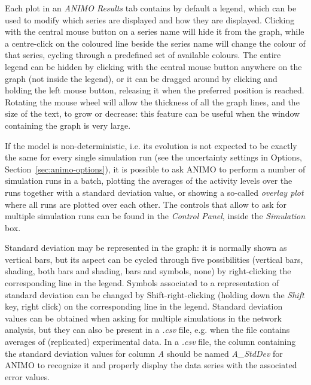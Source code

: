 \documentclass{article}
\begin{document}

Each plot in an \emph{ANIMO Results} tab contains by default a legend, which can be used to modify which series are
displayed and how they are displayed. Clicking with the central mouse button on a series name will hide it from the
graph, while a centre-click on the coloured line beside the series name will change the colour of that series,
cycling through a predefined set of available colours. The entire legend can be hidden by clicking with the
central mouse button anywhere on the graph (not inside the legend), or it can be dragged around by clicking and holding the left
mouse button, releasing it when the preferred position is reached. Rotating the mouse wheel will allow the thickness of all
the graph lines, and the size of the text, to grow or decrease: this feature can be useful when the window containing
the graph is very large.

If the model is non-deterministic, i.e. its
evolution is not expected to be exactly the same for every single simulation run (see the uncertainty settings in Options, Section~\ref{sec:animo-options}),
it is possible to ask ANIMO to perform
a number of simulation runs in a batch, plotting the averages of the activity levels over the runs together with a standard
deviation value, or showing a so-called \emph{overlay plot} where all runs are plotted over each other. The controls
that allow to ask for multiple simulation runs can be found in the \emph{Control Panel}, inside the \emph{Simulation} box.

Standard deviation may be represented in the graph: it is normally shown as vertical bars, but its aspect can be
cycled through five possibilities (vertical bars, shading, both bars and shading, bars and symbols, none) by right-clicking the
corresponding line in the legend. Symbols associated to a representation of standard deviation can be changed by Shift-right-clicking
(holding down the \emph{Shift} key, right click) on the corresponding line in the legend.
Standard deviation values can be obtained when asking for multiple simulations in the network
analysis, but they can also be present in a \emph{.csv} file, e.g. when the file contains averages of (replicated) experimental data.
In a \emph{.csv} file, the column containing the standard deviation values for column \emph{A}
should be named \emph{A\_{}StdDev} for ANIMO to recognize it and properly display the data series
with the associated error values.
\end{document}
